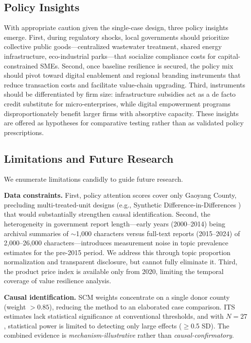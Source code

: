 \documentclass[sustainability,article,submit,moreauthors,pdftex]{mdpi}
\begin{document}
\subsection{Policy Insights}
With appropriate caution given the single-case design, three policy insights emerge. First, during regulatory shocks, local governments should prioritize collective public goods---centralized wastewater treatment, shared energy infrastructure, eco-industrial parks---that socialize compliance costs for capital-constrained SMEs. Second, once baseline resilience is secured, the policy mix should pivot toward digital enablement and regional branding instruments that reduce transaction costs and facilitate value-chain upgrading. Third, instruments should be differentiated by firm size: infrastructure subsidies act as a de facto credit substitute for micro-enterprises, while digital empowerment programs disproportionately benefit larger firms with absorptive capacity. These insights are offered as hypotheses for comparative testing rather than as validated policy prescriptions.

\subsection{Limitations and Future Research}
We enumerate limitations candidly to guide future research.

\textbf{Data constraints.} First, policy attention scores cover only Gaoyang County, precluding multi-treated-unit designs (e.g., Synthetic Difference-in-Differences \citep{Arkhangelsky2021}) that would substantially strengthen causal identification. Second, the heterogeneity in government report length---early years (2000--2014) being archival summaries of $\sim$1,000 characters versus full-text reports (2015--2024) of 2,000--26,000 characters---introduces measurement noise in topic prevalence estimates for the pre-2015 period. We address this through topic proportion normalization and transparent disclosure, but cannot fully eliminate it. Third, the product price index is available only from 2020, limiting the temporal coverage of value resilience analysis.

\textbf{Causal identification.} SCM weights concentrate on a single donor county (weight $>0.85$), reducing the method to an elaborated case comparison. ITS estimates lack statistical significance at conventional thresholds, and with $N=27$, statistical power is limited to detecting only large effects ($\geq$0.5 SD). The combined evidence is \emph{mechanism-illustrative} rather than \emph{causal-confirmatory}.
\end{document}
